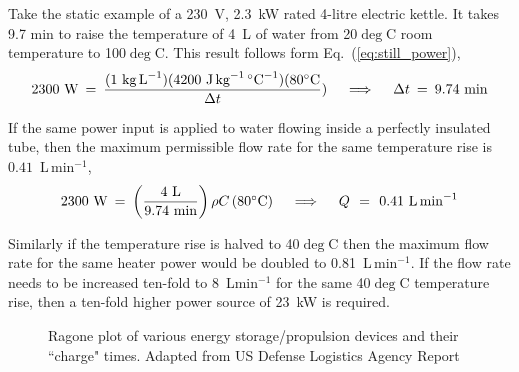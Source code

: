 Take the static example of a 230~V, 2.3~kW rated 4-litre electric kettle. It takes 9.7 min to raise the temperature of 4~L of water from 20$\deg$C room temperature to 100$\deg$C. This result follows form Eq.~(\ref{eq:still_power}),
%
\begin{equation}
\label{eq:kettle _still}
2300~\text{W} \:=\: \frac{(1~\text{kg\,L}^{-1})(4200~\text{J\,kg}^{-1}\,\hbox{$^\circ$} \text{C}^{-1}) (80\hbox{$^\circ$} \text{C}}{\Delta t})~~~ \implies~~~ \Delta t \:=\: 9.74~ \text{min}
\end{equation}



If the same power input is applied to water flowing inside a perfectly insulated tube, then the maximum permissible flow rate for the same temperature rise is $0.41$~L\,min$^{-1}$,
%
\begin{equation}
\label{eq:kettle _flow}
2300~\text{W}\:=\:\left(\frac{4~\text{L}}{9.74~\text{min}}\right)\rho C\,(80\hbox{$^\circ$} \text{C})~~~\implies ~~~ Q\,\:=\:\,0.41~\text{L\,min}^{-1}
\end{equation}


Similarly if the temperature rise is halved to 40$\deg$C then the maximum flow rate for the same heater power would be doubled to 0.81~L\,min$^{-1}$. If the flow rate needs to be increased ten-fold to 8~Lmin$^{-1}$ for the same 40$\deg$C temperature rise, then a ten-fold higher power source of 23~kW is required. 

\begin{figure}[t]
	\centering
	\caption[ Ragone plot]
		{%
		\label{fg:Ragone_plot}
		\centering
		Ragone plot of various energy storage/propulsion devices and their ``charge" times.  Adapted from US Defense Logistics Agency Report~\cite{Obey:09} 
	}
\end{figure}

